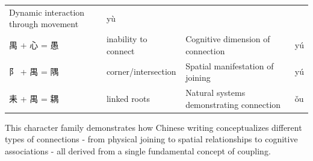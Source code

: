 \begin{longtable}[]{@{}llll@{}}
\begin{minipage}[t]{0.43\columnwidth}
Dynamic interaction through movement\strut
\end{minipage} & \begin{minipage}[t]{0.15\columnwidth}\raggedright
yù\strut
\end{minipage}\tabularnewline
\begin{minipage}[t]{0.15\columnwidth}\raggedright
禺 + 心 = 愚\strut
\end{minipage} & \begin{minipage}[t]{0.15\columnwidth}\raggedright
inability to connect\strut
\end{minipage} & \begin{minipage}[t]{0.43\columnwidth}\raggedright
Cognitive dimension of connection\strut
\end{minipage} & \begin{minipage}[t]{0.15\columnwidth}\raggedright
yú\strut
\end{minipage}\tabularnewline
\begin{minipage}[t]{0.15\columnwidth}\raggedright
阝 + 禺 = 隅\strut
\end{minipage} & \begin{minipage}[t]{0.15\columnwidth}\raggedright
corner/intersection\strut
\end{minipage} & \begin{minipage}[t]{0.43\columnwidth}\raggedright
Spatial manifestation of joining\strut
\end{minipage} & \begin{minipage}[t]{0.15\columnwidth}\raggedright
yú\strut
\end{minipage}\tabularnewline
\begin{minipage}[t]{0.15\columnwidth}\raggedright
耒 + 禺 = 耦\strut
\end{minipage} & \begin{minipage}[t]{0.15\columnwidth}\raggedright
linked roots\strut
\end{minipage} & \begin{minipage}[t]{0.43\columnwidth}\raggedright
Natural systems demonstrating connection\strut
\end{minipage} & \begin{minipage}[t]{0.15\columnwidth}\raggedright
ǒu\strut
\end{minipage}\tabularnewline
\bottomrule
\end{longtable}

This character family demonstrates how Chinese writing conceptualizes
different types of connections - from physical joining to spatial
relationships to cognitive associations - all derived from a single
fundamental concept of coupling.

